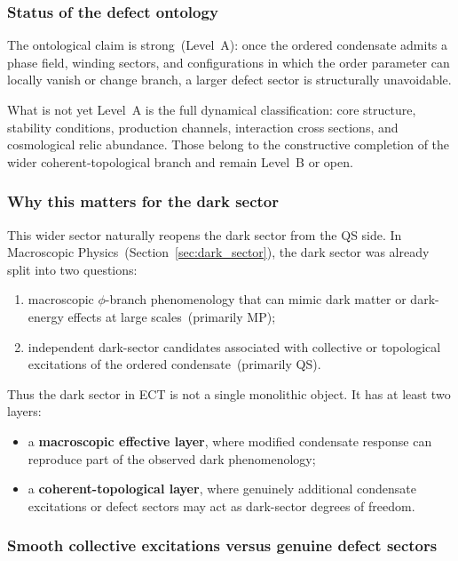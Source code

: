 \documentclass[11pt,a4paper]{article}
\numberwithin{equation}{section}
\begin{document}
\subsubsection*{Status of the defect ontology}

The ontological claim is strong~(Level~A): once the ordered condensate
admits a phase field, winding sectors, and configurations in which the
order parameter can locally vanish or change branch, a larger defect
sector is structurally unavoidable.

What is not yet Level~A is the full dynamical classification: core
structure, stability conditions, production channels, interaction cross
sections, and cosmological relic abundance.
Those belong to the constructive completion of the wider
coherent-topological branch and remain Level~B or open.

\subsubsection*{Why this matters for the dark sector}

This wider sector naturally reopens the dark sector from the QS side.
In Macroscopic Physics~(Section~\ref{sec:dark_sector}), the dark sector
was already split into two questions:
\begin{enumerate}[label=(\roman*)]
  \item macroscopic $\phi$-branch phenomenology that can mimic dark
    matter or dark-energy effects at large scales~(primarily MP);
  \item independent dark-sector candidates associated with collective or
    topological excitations of the ordered condensate~(primarily QS).
\end{enumerate}
Thus the dark sector in ECT is not a single monolithic object.
It has at least two layers:
\begin{itemize}
  \item a \textbf{macroscopic effective layer}, where modified condensate
    response can reproduce part of the observed dark phenomenology;
  \item a \textbf{coherent-topological layer}, where genuinely additional
    condensate excitations or defect sectors may act as dark-sector
    degrees of freedom.
\end{itemize}

\subsubsection*{Smooth collective excitations versus genuine defect sectors}
\end{document}
